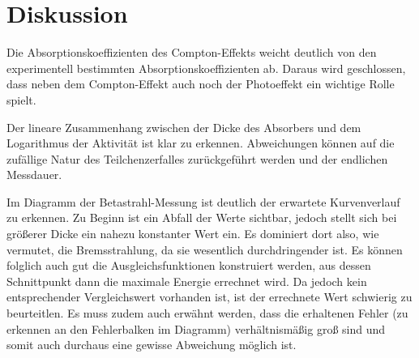 \section{Diskussion}
\label{sec:Diskussion}

Die Absorptionskoeffizienten des Compton-Effekts weicht deutlich von den experimentell bestimmten Absorptionskoeffizienten ab.
Daraus wird geschlossen, dass neben dem Compton-Effekt auch noch der Photoeffekt ein wichtige Rolle spielt.

Der lineare Zusammenhang zwischen der Dicke des Absorbers und dem Logarithmus der Aktivität ist klar zu erkennen.
Abweichungen können auf die zufällige Natur des Teilchenzerfalles zurückgeführt werden und der endlichen Messdauer.

Im Diagramm der Betastrahl-Messung ist deutlich der erwartete Kurvenverlauf zu erkennen. Zu Beginn ist ein Abfall der
Werte sichtbar, jedoch stellt sich bei größerer Dicke ein nahezu konstanter Wert ein. Es dominiert dort also, wie vermutet, die Bremsstrahlung, da
sie wesentlich durchdringender ist. Es können folglich auch gut die Ausgleichsfunktionen konstruiert werden, aus dessen Schnittpunkt
dann die maximale Energie errechnet wird. Da jedoch kein entsprechender Vergleichswert vorhanden ist, ist der errechnete Wert schwierig
zu beurteitlen. Es muss zudem auch erwähnt werden, dass die erhaltenen Fehler (zu erkennen an den Fehlerbalken im Diagramm) verhältnismäßig
groß sind und somit auch durchaus eine gewisse Abweichung möglich ist.
